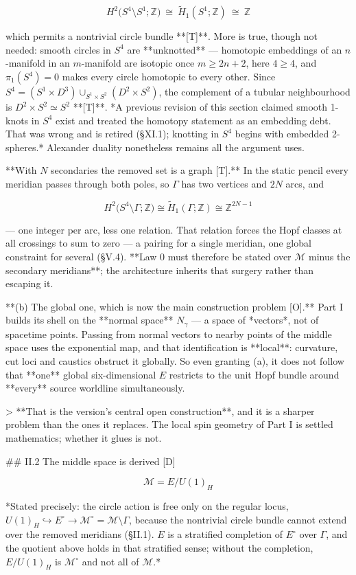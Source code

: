 $$H^2\big(S^4\setminus S^1;\mathbb{Z}\big)\ \cong\ \tilde H_1(S^1;\mathbb{Z})\ \cong\ \mathbb{Z}$$

which permits a nontrivial circle bundle **[T]**. More is true, though not needed: smooth circles in $S^4$ are **unknotted** — homotopic embeddings of an $n$-manifold in an $m$-manifold are isotopic once $m\geq2n+2$, here $4\geq4$, and $\pi_1(S^4) = 0$ makes every circle homotopic to every other. Since $S^4 = (S^1\times D^3)\cup_{S^1\times S^2}(D^2\times S^2)$, the complement of a tubular neighbourhood is $D^2\times S^2\simeq S^2$ **[T]**. *A previous revision of this section claimed smooth 1-knots in $S^4$ exist and treated the homotopy statement as an embedding debt. That was wrong and is retired (§XI.1); knotting in $S^4$ begins with embedded 2-spheres.* Alexander duality nonetheless remains all the argument uses.

**With $N$ secondaries the removed set is a graph [T].** In the static pencil every meridian passes through both poles, so $\Gamma$ has two vertices and $2N$ arcs, and

$$H^2\big(S^4\setminus\Gamma;\mathbb{Z}\big)\cong\tilde H_1(\Gamma;\mathbb{Z})\cong\mathbb{Z}^{2N-1}$$

— one integer per arc, less one relation. That relation forces the Hopf classes at all crossings to sum to zero — a pairing for a single meridian, one global constraint for several (§V.4). **Law 0 must therefore be stated over $\mathcal{M}$ minus the secondary meridians**; the architecture inherits that surgery rather than escaping it.

**(b) The global one, which is now the main construction problem [O].** Part I builds its shell on the **normal space** $N_\gamma$ — a space of *vectors*, not of spacetime points. Passing from normal vectors to nearby points of the middle space uses the exponential map, and that identification is **local**: curvature, cut loci and caustics obstruct it globally. So even granting (a), it does not follow that **one** global six-dimensional $E$ restricts to the unit Hopf bundle around **every** source worldline simultaneously.

> **That is the version's central open construction**, and it is a sharper problem than the ones it replaces. The local spin geometry of Part I is settled mathematics; whether it glues is not.

## II.2 The middle space is derived [D]

$$\mathcal{M} = E/U(1)_H$$

*Stated precisely: the circle action is free only on the regular locus, $U(1)_H\hookrightarrow E^\circ\to\mathcal M^\circ = \mathcal M\setminus\Gamma$, because the nontrivial circle bundle cannot extend over the removed meridians (§II.1). $E$ is a stratified completion of $E^\circ$ over $\Gamma$, and the quotient above holds in that stratified sense; without the completion, $E/U(1)_H$ is $\mathcal M^\circ$ and not all of $\mathcal M$.*

